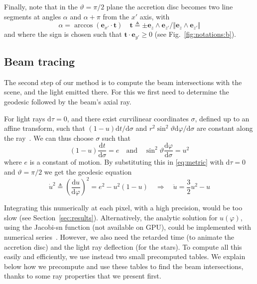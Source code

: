 \documentclass{document}
\newcommand{\diff}{\mathrm d}
\begin{document}
Finally, note that in the $\vartheta = \pi/2$ plane the accretion disc becomes 
two line segments at angles $\alpha$ and $\alpha + \pi$ from the $x'$ axis, with
\begin{equation}
\alpha = \arccos({\mathbf e}_{x'} \cdot {\mathbf t}) \quad
    {\mathbf t} \triangleq \pm{\mathbf e}_z\wedge{\mathbf e}_{z'} /
        \Vert {\mathbf e}_z \wedge {\mathbf e}_{z'} \Vert
\label{eq:alpha}
\end{equation}
and where the sign is chosen such that ${\mathbf t} \cdot {\mathbf e}_{y'} \ge 
0$ (see Fig.~\ref{fig:notations:b}).

\subsection{Beam tracing}\label{sec:beamtracing}

The second step of our method is to compute the beam intersections with the 
scene, and the light emitted there. For this we first need to determine the 
geodesic followed by the beam's axial ray.

For light rays $\diff\tau = 0$, and there exist curvilinear coordinates 
$\sigma$, defined up to an affine transform, such that $(1-u)\diff t / \diff 
\sigma$ and $r^2 \sin^2\vartheta \diff \varphi  /\diff \sigma$ are constant 
along the ray~\cite{weinberg1972}. We can thus choose $\sigma$ such that
\begin{equation}
(1 - u)\frac{\diff t}{\diff \sigma} = e \quad \mathrm{and} \quad
    \sin^2\vartheta \frac{\diff \varphi}{\diff \sigma} = u^2 
\label{eq:motionconstants}
\end{equation}
where $e$ is a constant of motion. By substituting this in \eqref{eq:metric} 
with $\diff \tau = 0$ and $\vartheta = \pi/2$ we get the geodesic equation
\begin{equation}
\dot{u}^2 \triangleq \left(\frac{\diff u}{\diff \varphi}\right)^2 
    = e^2 - u^2 (1 - u) \quad \Rightarrow \quad
\ddot{u} = \frac{3}{2} u^2 - u\label{eq:rayequation}
\end{equation}

Integrating this numerically at each pixel, with a high precision, would be too
slow (see Section~\ref{sec:results}). Alternatively, the analytic solution for 
$u(\varphi)$, using the Jacobi-sn function (not available on GPU), could be 
implemented with numerical series~\cite{Muller2012}. However, we also need the 
retarded time (to animate the accretion disc) and the light ray deflection (for 
the stars). To compute all this easily and efficiently, we use instead two 
small precomputed tables. We explain below how we precompute and use these 
tables to find the beam intersections, thanks to some ray properties that we 
present first.
\end{document}
